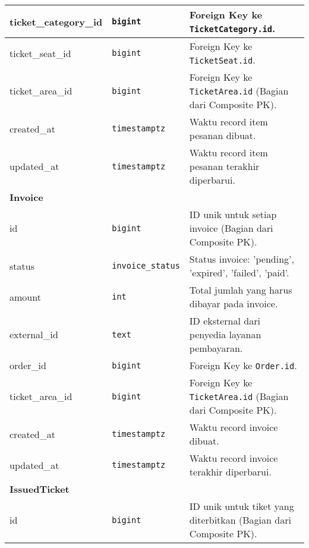 \begin{longtable}{|l|p{}|p{}|}
	\hline
	ticket\_category\_id & \texttt{bigint}          & Foreign Key ke \texttt{TicketCategory.id}.                          \\
	\hline
	ticket\_seat\_id     & \texttt{bigint}          & Foreign Key ke \texttt{TicketSeat.id}.                              \\
	\hline
	ticket\_area\_id     & \texttt{bigint}          & Foreign Key ke \texttt{TicketArea.id} (Bagian dari Composite PK).   \\
	\hline
	created\_at          & \texttt{timestamptz}     & Waktu record item pesanan dibuat.                                   \\
	\hline
	updated\_at          & \texttt{timestamptz}     & Waktu record item pesanan terakhir diperbarui.                      \\
	\hline
	\multicolumn{3}{|l|}{\textbf{Invoice}}                                                                                \\
	\hline
	id                   & \texttt{bigint}          & ID unik untuk setiap invoice (Bagian dari Composite PK).            \\
	\hline
	status               & \texttt{invoice\_status} & Status invoice: 'pending', 'expired', 'failed', 'paid'.             \\
	\hline
	amount               & \texttt{int}             & Total jumlah yang harus dibayar pada invoice.                       \\
	\hline
	external\_id         & \texttt{text}            & ID eksternal dari penyedia layanan pembayaran.                      \\
	\hline
	order\_id            & \texttt{bigint}          & Foreign Key ke \texttt{Order.id}.                                   \\
	\hline
	ticket\_area\_id     & \texttt{bigint}          & Foreign Key ke \texttt{TicketArea.id} (Bagian dari Composite PK).   \\
	\hline
	created\_at          & \texttt{timestamptz}     & Waktu record invoice dibuat.                                        \\
	\hline
	updated\_at          & \texttt{timestamptz}     & Waktu record invoice terakhir diperbarui.                           \\
	\hline
	\multicolumn{3}{|l|}{\textbf{IssuedTicket}}                                                                           \\
	\hline
	id                   & \texttt{bigint}          & ID unik untuk tiket yang diterbitkan (Bagian dari Composite PK).    \\

\end{longtable}
